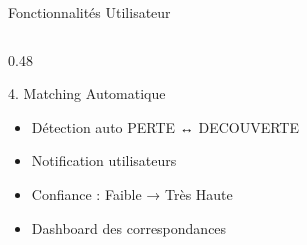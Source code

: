 \documentclass[aspectratio=169]{beamer}
\begin{document}
\begin{frame}{Fonctionnalités Utilisateur}
\begin{columns}[T]
\begin{column}{0.48\textwidth}
            \begin{block}{4. Matching Automatique}
                \begin{itemize}
                    \item Détection auto PERTE ↔ DECOUVERTE
                    \item Notification utilisateurs
                    \item Confiance : Faible → Très Haute
                    \item Dashboard des correspondances
                \end{itemize}
            \end{block}
        \end{column}
    \end{columns}
\end{frame}
\end{document}
